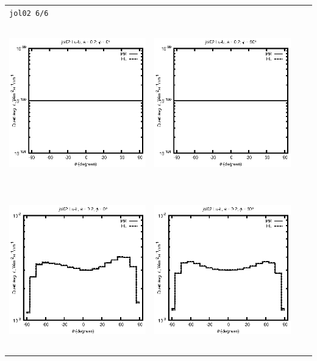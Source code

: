 \begin{tabular}{c c c c}
\multicolumn{4}{l}{\texttt{jol02 6/6}} \\
\includegraphics[height=7cm]{../eps/jol02_Lu_b_fwd.eps} &
\includegraphics[height=7cm]{../eps/jol02_Lu_b_cross.eps} \\
\includegraphics[height=7cm]{../eps/jol02_Lu_it_fwd.eps} &
\includegraphics[height=7cm]{../eps/jol02_Lu_it_cross.eps} \\

\end{tabular}

